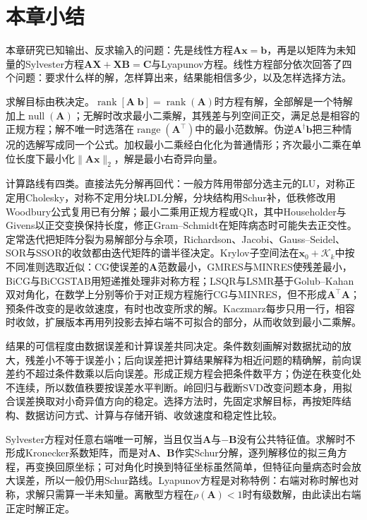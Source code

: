 \section{本章小结}
\label{sec:ls-equations-summary}

本章研究已知输出、反求输入的问题：先是线性方程$\bm A\bm x=\bm b$，再是以矩阵为未知量的Sylvester方程$\bm A\bm X+\bm X\bm B=\bm C$与Lyapunov方程。线性方程部分依次回答了四个问题：要求什么样的解，怎样算出来，结果能相信多少，以及怎样选择方法。

求解目标由秩决定。$\operatorname{rank}[\bm A\;\bm b]=\operatorname{rank}(\bm A)$时方程有解，全部解是一个特解加上$\operatorname{null}(\bm A)$；无解时改求最小二乘解，其残差与列空间正交，满足总是相容的正规方程；解不唯一时选落在$\operatorname{range}(\bm A^\top)$中的最小范数解。伪逆$\bm A^\dagger\bm b$把三种情况的选解写成同一个公式。加权最小二乘经白化化为普通情形；齐次最小二乘在单位长度下最小化$\lVert\bm A\bm x\rVert_2$，解是最小右奇异向量。

计算路线有四类。直接法先分解再回代：一般方阵用带部分选主元的LU，对称正定用Cholesky，对称不定用分块LDL分解，分块结构用Schur补，低秩修改用Woodbury公式复用已有分解；最小二乘用正规方程或QR，其中Householder与Givens以正交变换保持长度，修正Gram--Schmidt在矩阵病态时可能失去正交性。定常迭代把矩阵分裂为易解部分与余项，Richardson、Jacobi、Gauss--Seidel、SOR与SSOR的收敛都由迭代矩阵的谱半径决定。Krylov子空间法在$\bm x_0+\mathcal K_k$中按不同准则选取近似：CG使误差的$\bm A$范数最小，GMRES与MINRES使残差最小，BiCG与BiCGSTAB用短递推处理非对称方程；LSQR与LSMR基于Golub--Kahan双对角化，在数学上分别等价于对正规方程施行CG与MINRES，但不形成$\bm A^\top\bm A$；预条件改变的是收敛速度，有时也改变所求的解。Kaczmarz每步只用一行，相容时收敛，扩展版本再用列投影去掉右端不可拟合的部分，从而收敛到最小二乘解。

结果的可信程度由数据误差和计算误差共同决定。条件数刻画解对数据扰动的放大，残差小不等于误差小；后向误差把计算结果解释为相近问题的精确解，前向误差约不超过条件数乘以后向误差。形成正规方程会把条件数平方；伪逆在秩变化处不连续，所以数值秩要按误差水平判断。岭回归与截断SVD改变问题本身，用拟合误差换取对小奇异值方向的稳定。选择方法时，先固定求解目标，再按矩阵结构、数据访问方式、计算与存储开销、收敛速度和稳定性比较。

Sylvester方程对任意右端唯一可解，当且仅当$\bm A$与$-\bm B$没有公共特征值。求解时不形成Kronecker系数矩阵，而是对$\bm A$、$\bm B$作实Schur分解，逐列解移位的拟三角方程，再变换回原坐标；可对角化时换到特征坐标虽然简单，但特征向量病态时会放大误差，所以一般仍用Schur路线。Lyapunov方程是对称特例：右端对称时解也对称，求解只需算一半未知量。离散型方程在$\rho(\bm A)<1$时有级数解，由此读出右端正定时解正定。
